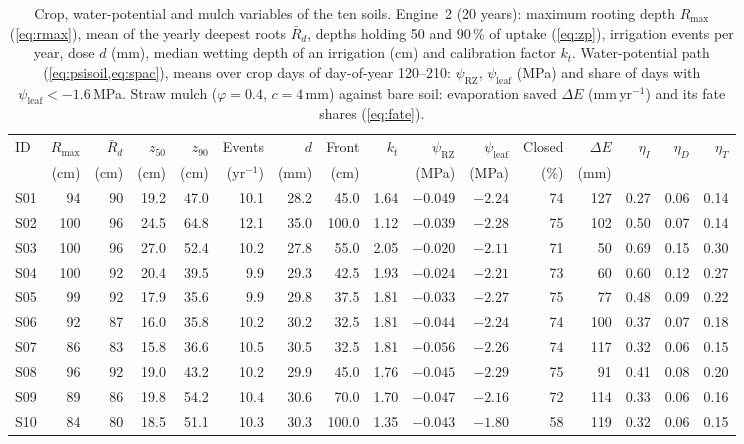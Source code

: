 \documentclass[preprint,12pt]{elsarticle}
\begin{document}
\begin{table}[H]\centering\small
\caption{Crop, water-potential and mulch variables of the ten soils. Engine~2 (20 years): maximum rooting depth $R_{\max}$ (\cref{eq:rmax}), mean of the yearly deepest roots $\bar R_d$, depths holding 50 and 90\,\% of uptake (\cref{eq:zp}), irrigation events per year, dose $d$ (mm), median wetting depth of an irrigation (cm) and calibration factor $k_t$. Water-potential path (\cref{eq:psisoil,eq:spac}), means over crop days of day-of-year 120--210: $\psi_{\mathrm{RZ}}$, $\psi_{\mathrm{leaf}}$ (MPa) and share of days with $\psi_{\mathrm{leaf}}<-1.6$\,MPa. Straw mulch ($\varphi=0.4$, $c=4$\,mm) against bare soil: evaporation saved $\Delta E$ (mm\,yr$^{-1}$) and its fate shares (\cref{eq:fate}).}
\label{tab:swa-plant}
\setlength{\tabcolsep}{2.2pt}\footnotesize
\begin{tabular}{lrrrrrrrrrrrrrrr}
\toprule
ID & $R_{\max}$ & $\bar R_d$ & $z_{50}$ & $z_{90}$ & Events & $d$ & Front & $k_t$ & $\psi_{\mathrm{RZ}}$ & $\psi_{\mathrm{leaf}}$ & Closed & $\Delta E$ & $\eta_I$ & $\eta_D$ & $\eta_T$\\
 & (cm) & (cm) & (cm) & (cm) & (yr$^{-1}$) & (mm) & (cm) & & (MPa) & (MPa) & (\%) & (mm) & & & \\\midrule
S01 & 94 & 90 & 19.2 & 47.0 & 10.1 & 28.2 & 45.0 & 1.64 & $-0.049$ & $-2.24$ & 74 & 127 & 0.27 & 0.06 & 0.14\\
S02 & 100 & 96 & 24.5 & 64.8 & 12.1 & 35.0 & 100.0 & 1.12 & $-0.039$ & $-2.28$ & 75 & 102 & 0.50 & 0.07 & 0.14\\
S03 & 100 & 96 & 27.0 & 52.4 & 10.2 & 27.8 & 55.0 & 2.05 & $-0.020$ & $-2.11$ & 71 & 50 & 0.69 & 0.15 & 0.30\\
S04 & 100 & 92 & 20.4 & 39.5 & 9.9 & 29.3 & 42.5 & 1.93 & $-0.024$ & $-2.21$ & 73 & 60 & 0.60 & 0.12 & 0.27\\
S05 & 99 & 92 & 17.9 & 35.6 & 9.9 & 29.8 & 37.5 & 1.81 & $-0.033$ & $-2.27$ & 75 & 77 & 0.48 & 0.09 & 0.22\\
S06 & 92 & 87 & 16.0 & 35.8 & 10.2 & 30.2 & 32.5 & 1.81 & $-0.044$ & $-2.24$ & 74 & 100 & 0.37 & 0.07 & 0.18\\
S07 & 86 & 83 & 15.8 & 36.6 & 10.5 & 30.5 & 32.5 & 1.81 & $-0.056$ & $-2.26$ & 74 & 117 & 0.32 & 0.06 & 0.15\\
S08 & 96 & 92 & 19.0 & 43.2 & 10.2 & 29.9 & 45.0 & 1.76 & $-0.045$ & $-2.29$ & 75 & 91 & 0.41 & 0.08 & 0.20\\
S09 & 89 & 86 & 19.8 & 54.2 & 10.4 & 30.6 & 70.0 & 1.70 & $-0.047$ & $-2.16$ & 72 & 114 & 0.33 & 0.06 & 0.16\\
S10 & 84 & 80 & 18.5 & 51.1 & 10.3 & 30.3 & 100.0 & 1.35 & $-0.043$ & $-1.80$ & 58 & 119 & 0.32 & 0.06 & 0.15\\\bottomrule
\end{tabular}
\end{table}
\end{document}
